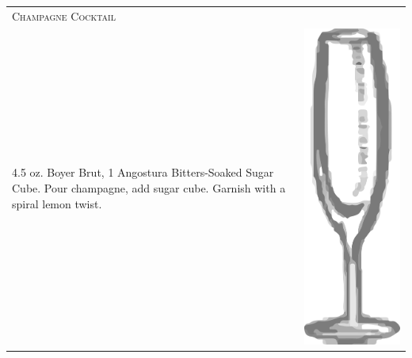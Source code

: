 \documentclass{article}
\begin{document}
\begin{multicols}{2}
\begin{tabular}{p{2in} p{0.5in}}
\multicolumn{2}{p{3in}}{\centering\Huge\textsc{Champagne Cocktail}} \\ 
  \vspace{-0.1in}4.5 oz. Boyer Brut, 1 Angostura Bitters-Soaked Sugar Cube. Pour champagne, add sugar cube.  Garnish with a spiral lemon twist. &
  \vspace{-0.1in} \includegraphics{flute.png}
\end{tabular}


\end{multicols}
\end{document}
